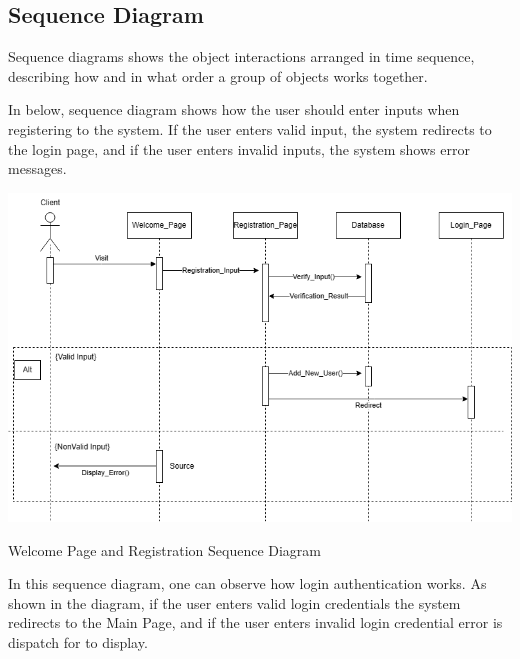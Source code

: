 

   \subsection{Sequence Diagram}

\hspace{5mm}Sequence diagrams shows the object interactions arranged in time sequence, describing how and in what order a group of objects works together.

In below, sequence diagram shows how the user should enter inputs when registering to the system. If the user enters valid input, the system redirects to the login page, and if the user enters invalid inputs, the system shows error messages.\newline

\begin{center}
    \includegraphics[scale=0.6]{SequenceDiagram_WelcomePageRegisterPage.png}
    \caption{Welcome Page and Registration Sequence Diagram}
\end{center}

In this sequence diagram, one can observe how login authentication works. As shown in the diagram, if the user enters valid  login credentials the system redirects to the Main Page, and if the user enters invalid login credential error is dispatch for to display.
    
